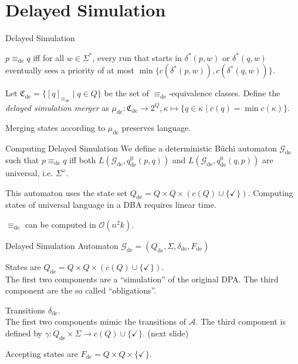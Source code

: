 \section{Delayed Simulation}
\begin{frame}{Delayed Simulation}
\begin{defn}
	$p \equiv_\text{de} q$ iff for all $w \in \Sigma^*$, every run that starts in $\delta^*(p, w)$ or $\delta^*(q, w)$ eventually sees a priority of at most $\min \{c(\delta^*(p, w)), c(\delta^*(q, w))\}$.
\end{defn}

\begin{defn}
	Let $\mathfrak{C}_\text{de} = \{ [q]_{\equiv_\text{de}} \mid q \in Q \}$ be the set of $\equiv_\text{de}$-equivalence classes.	Define the \emph{delayed simulation merger} as $\mu_\text{de} : \mathfrak{C}_\text{de} \rightarrow 2^Q, \kappa \mapsto \{ q \in \kappa \mid c(q) = \min c(\kappa) \}$.
\end{defn}

\begin{theorem}
	Merging states according to $\mu_\text{de}$ preserves language.
\end{theorem}
\end{frame}


\begin{frame}{Computing Delayed Simulation}
	We define a deterministic Büchi automaton $\mathcal{G}_\text{de}$ such that $p \equiv_\text{de} q$ iff both $L(\mathcal{G}_\text{de}, q_\text{de}^0(p, q))$ and $L(\mathcal{G}_\text{de}, q_\text{de}^0(q, p))$ are universal, i.e. $\Sigma^\omega$.
	
	This automaton uses the state set $Q_\text{de} = Q \times Q \times (c(Q) \cup \{\checkmark\})$. Computing states of universal language in a DBA requires linear time.
	
	\begin{theorem}
		$\equiv_\text{de}$ can be computed in $\mathcal{O}(n^2 k)$.
	\end{theorem}
\end{frame}

\begin{frame}{Delayed Simulation Automaton}
$\mathcal{G}_\text{de} = (Q_\text{de}, \Sigma, \delta_\text{de}, F_\text{de})$

States are $Q_\text{de} = Q \times Q \times (c(Q) \cup \{\checkmark\})$. \\
The first two components are a \enquote{simulation} of the original DPA. The third component are the so called \enquote{obligations}.

Transitions $\delta_\text{de}$. \\
The first two components mimic the transitions of $\mathcal{A}$. The third component is defined by $\gamma : Q_\text{de} \times \Sigma \rightarrow c(Q) \cup \{\checkmark\}$. (next slide)

Accepting states are $F_\text{de} = Q \times Q \times \{\checkmark\}$.

\end{frame}


